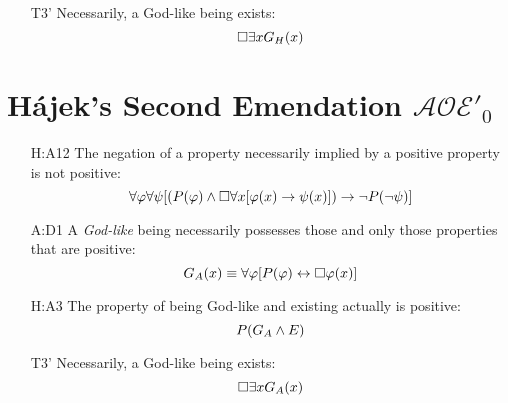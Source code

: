 \documentclass{birkjour}
\newcommand{\AOEHH}{$\mathcal{AOE}'_0$}
\theoremstyle{definition}
\theoremstyle{remark}
\numberwithin{equation}{section}
\begin{document}
\begin{appendix}
\begin{itemize}
\item[T3'] Necessarily, a God-like being exists: $$\Box \exists x G_H(x)$$
% 
\end{itemize}


\section{Hájek's Second Emendation \AOEHH} \label{apx:Hajek2}
\begin{itemize}
\item[H:A12] The negation of a property necessarily implied by a
  positive property is not positive:
  $$\forall \varphi \forall \psi [(P(\varphi) \wedge \Box \forall x [\varphi(x)
  \rightarrow \psi(x)]) \rightarrow \neg P(\neg \psi)]$$
\item[A:D1] A \emph{God-like} being necessarily possesses those and only those properties that are positive: 
  $$G_A(x) \equiv \forall \varphi [P(\varphi) \leftrightarrow \Box \varphi(x)]$$ 
\item[H:A3]  The property of being God-like and existing actually is positive: 
  $$P(G_A \wedge E)$$
\item[T3'] Necessarily, a God-like being exists: $$\Box \exists x G_A(x)$$
% 
\end{itemize}




\end{appendix}
\end{document}
